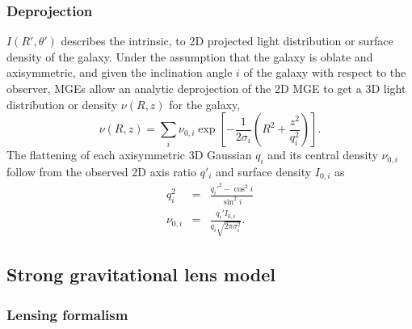 \documentclass[useAMS,usenatbib]{mnras}
\begin{document}
\subsubsection{Deprojection}

$I(R',\theta')$ describes the intrinsic, to 2D projected light distribution or surface density of the galaxy. Under the assumption that the galaxy is oblate and axisymmetric, and given the inclination angle $i$ of the galaxy with respect to the observer, MGEs allow an analytic deprojection of the 2D MGE to get a 3D light distribution or density $\nu(R,z)$ for the galaxy,
\begin{equation}
\nu(R,z) = \sum_i \nu_{0,i} \exp \left[-\frac{1}{2\sigma_i}\left(R^2 + \frac{z^2}{q_i^2} \right) \right]. \label{eq:deprojMGE}
\end{equation}
The flattening of each axisymmetric 3D Gaussian $q_i$ and its central density $\nu_{0,i}$ follow from the observed 2D axis ratio $q'_i$ and surface density $I_{0,i}$ as
\begin{eqnarray*}
q_i^2 &=& \frac{q_i'^2 - \cos^2 i}{\sin^2 i}\\
\nu_{0,i} &=& \frac{q_i' I_{0,i}}{q_i \sqrt{2 \pi \sigma_i^2}}.
\end{eqnarray*}

\subsection{Strong gravitational lens model} \label{sec:lensing_theo}

\subsubsection{Lensing formalism}
\end{document}
